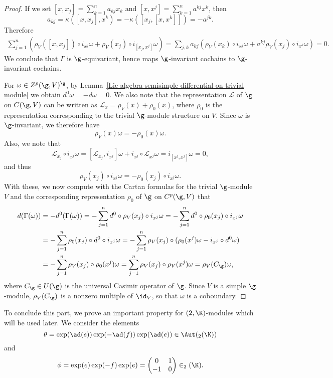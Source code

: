 \begin{proof}
If we set $[x,x_j]=\sum_{k=1}^{n}a_{kj}x_k$ and $[x,x^j]=\sum_{k=1}^{n}a^{kj}x^k$, then
\[a_{kj}=\kappa([x,x_j],x^k)=-\kappa([x_j,[x,x^k]])=-a^{jk}.\]
Therefore
\begin{equation*}\scriptstyle
\begin{aligned}
\sum_{j=1}^{n}(\rho_V([x,x_j])\circ i_{x^j}\omega+\rho_V(x_j)\circ i_{[x_j,x^j]}\omega)=\sum_{j,k}a_{kj}(\rho_V(x_k)\circ i_{x^j}\omega+a^{kj}\rho_V(x_j)\circ i_{x^k}\omega)=0.
\end{aligned}
\end{equation*}
We conclude that $\Gamma$ is $\g$-equivariant, hence maps $\g$-invariant cochains to $\g$-invariant cochains.\par
For $\omega\in Z^p(\g,V)^\g$, by Lemma~\ref{Lie algebra semisimple differential on trivial module} we obtain $d^0\omega=-d\omega=0$. We also note that the representation $\mathcal{L}$ of $\g$ on $C(\g,V)$ can be written as $\mathcal{L}_x=\rho_V(x)+\rho_0(x)$, where $\rho_0$ is the representation corresponding to the trivial $\g$-module structure on $V$. Since $\omega$ is $\g$-invariant, we therefore have
\[\rho_V(x)\omega=-\rho_0(x)\omega.\]
Also, we note that
\[\mathcal{L}_{x_j}\circ i_{x^j}\omega=[\mathcal{L}_{x_j},i_{x^j}]\omega+i_{x^j}\circ\mathcal{L}_{x^j}\omega=i_{[x^j,x^j]}\omega=0,\]
and thus
\[\rho_V(x_j)\circ i_{x^j}\omega=-\rho_0(x_j)\circ i_{x^j}\omega.\]
With these, we now compute with the Cartan formulas for the trivial $\g$-module $V$ and the corresponding representation $\rho_0$ of $\g$ on $C^p(\g,V)$ that
\begin{align*}
d(\Gamma(\omega))&=-d^0(\Gamma(\omega))=-\sum_{j=1}^{n}d^0\circ\rho_V(x_j)\circ i_{x^j}\omega=-\sum_{j=1}^{n}d^0\circ\rho_0(x_j)\circ i_{x^j}\omega\\
&=-\sum_{j=1}^{n}\rho_0(x_j)\circ d^0\circ i_{x^j}\omega=-\sum_{j=1}^{n}\rho_V(x_j)\circ(\rho_0(x^j)\omega-i_{x^j}\circ d^0\omega)\\
&=-\sum_{j=1}^{n}\rho_V(x_j)\circ\rho_0(x^j)\omega=\sum_{j=1}^{n}\rho_V(x_j)\circ\rho_V(x^j)\omega=\rho_V(C_\g)\omega,
\end{align*}
where $C_\g\in U(\g)$ is the universal Casimir operator of $\g$. Since $V$ is a simple $\g$-module, $\rho_V(C_\g)$ is a nonzero multiple of $\id_V$, so that $\omega$ is a coboundary.
\end{proof}
To conclude this part, we prove an important property for $\sl(2,\K)$-modules which will be used later. We consider the elements
\[\theta=\exp(\ad(e))\exp(-\ad(f))\exp(\ad(e))\in\Aut(\sl_2(\K))\]
and
\[\phi=\exp(e)\exp(-f)\exp(e)=\begin{pmatrix}
0&1\\
-1&0
\end{pmatrix}\in\sl_2(\K).\]
